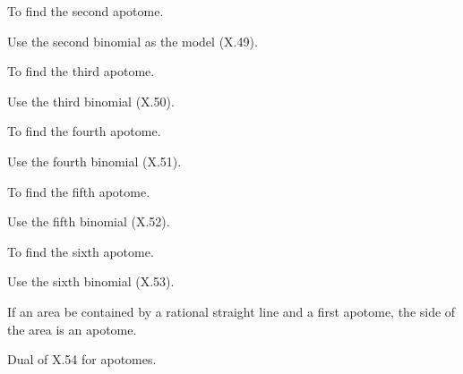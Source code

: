 \documentclass{rrxiv}
\begin{document}
\begin{claim}
\label{prop:X.86}
To find the second apotome.
\end{claim}
\begin{evidence}[Proof of X.86]
\label{ev:X.86}
Use the second binomial as the model (X.49).
\end{evidence}

\begin{claim}
\label{prop:X.87}
To find the third apotome.
\end{claim}
\begin{evidence}[Proof of X.87]
\label{ev:X.87}
Use the third binomial (X.50).
\end{evidence}

\begin{claim}
\label{prop:X.88}
To find the fourth apotome.
\end{claim}
\begin{evidence}[Proof of X.88]
\label{ev:X.88}
Use the fourth binomial (X.51).
\end{evidence}

\begin{claim}
\label{prop:X.89}
To find the fifth apotome.
\end{claim}
\begin{evidence}[Proof of X.89]
\label{ev:X.89}
Use the fifth binomial (X.52).
\end{evidence}

\begin{claim}
\label{prop:X.90}
To find the sixth apotome.
\end{claim}
\begin{evidence}[Proof of X.90]
\label{ev:X.90}
Use the sixth binomial (X.53).
\end{evidence}

\begin{claim}
\label{prop:X.91}
If an area be contained by a rational straight line and a first
apotome, the side of the area is an apotome.
\end{claim}
\begin{evidence}[Proof of X.91]
\label{ev:X.91}
Dual of X.54 for apotomes.
\end{evidence}
\end{document}
